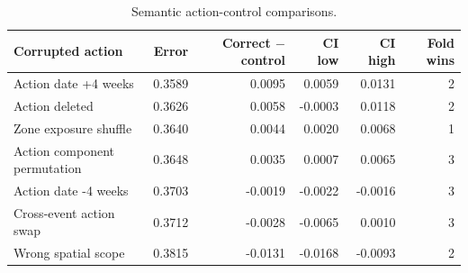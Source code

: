 \begin{table}[H]
\caption{Semantic action-control comparisons.}
\label{tab:tab3_action_controls}
\scriptsize
\setlength{\tabcolsep}{4pt}
\begin{tabular}{lrrrrr}
\toprule
Corrupted action & Error & Correct $-$ control & CI low & CI high & Fold wins \\
\midrule
Action date +4 weeks & 0.3589 & 0.0095 & 0.0059 & 0.0131 & 2 \\
Action deleted & 0.3626 & 0.0058 & -0.0003 & 0.0118 & 2 \\
Zone exposure shuffle & 0.3640 & 0.0044 & 0.0020 & 0.0068 & 1 \\
Action component permutation & 0.3648 & 0.0035 & 0.0007 & 0.0065 & 3 \\
Action date -4 weeks & 0.3703 & -0.0019 & -0.0022 & -0.0016 & 3 \\
Cross-event action swap & 0.3712 & -0.0028 & -0.0065 & 0.0010 & 3 \\
Wrong spatial scope & 0.3815 & -0.0131 & -0.0168 & -0.0093 & 2 \\
\bottomrule
\end{tabular}
\end{table}
